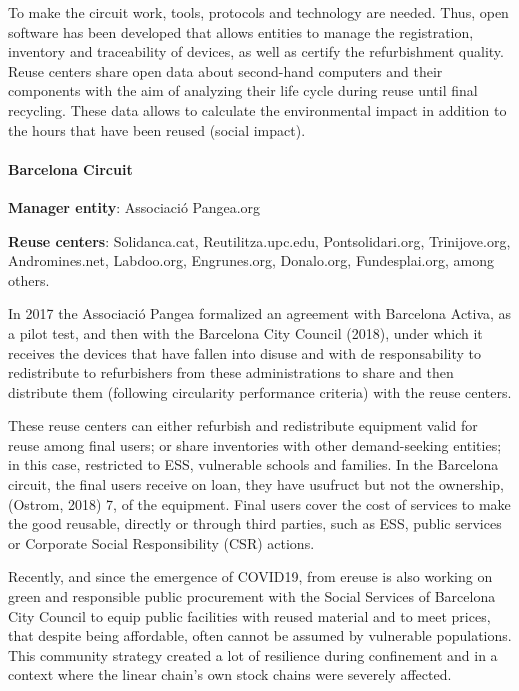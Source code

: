 \documentclass[
]{book}
\begin{document}
To make the circuit work, tools, protocols and technology are needed. Thus, open software has been developed that allows entities to manage the registration, inventory and traceability of devices, as well as certify the refurbishment quality. Reuse centers share open data about second-hand computers and their components with the aim of analyzing their life cycle during reuse until final recycling. These data allows to calculate the environmental impact in addition to the hours that have been reused (social impact).

\hypertarget{barcelona-circuit}{%
\paragraph{Barcelona Circuit}\label{barcelona-circuit}}

\textbf{Manager entity}: Associació Pangea.org

\textbf{Reuse centers}: Solidanca.cat, Reutilitza.upc.edu, Pontsolidari.org, Trinijove.org, Andromines.net, Labdoo.org, Engrunes.org, Donalo.org, Fundesplai.org, among others.

In 2017 the Associació Pangea formalized an agreement with Barcelona Activa, as a pilot test, and then with the Barcelona City Council (2018), under which it receives the devices that have fallen into disuse and with de responsability to redistribute to refurbishers from these administrations to share and then distribute them (following circularity performance criteria) with the reuse centers.

These reuse centers can either refurbish and redistribute equipment valid for reuse among final users; or share inventories with other demand-seeking entities; in this case, restricted to ESS, vulnerable schools and families. In the Barcelona circuit, the final users receive on loan, they have usufruct but not the ownership, (Ostrom, 2018) 7, of the equipment. Final users cover the cost of services to make the good reusable, directly or through third parties, such as ESS, public services or Corporate Social Responsibility (CSR) actions.

Recently, and since the emergence of COVID19, from ereuse is also working on green and responsible public procurement with the Social Services of Barcelona City Council to equip public facilities with reused material and to meet prices, that despite being affordable, often cannot be assumed by vulnerable populations. This community strategy created a lot of resilience during confinement and in a context where the linear chain's own stock chains were severely affected.
\end{document}
